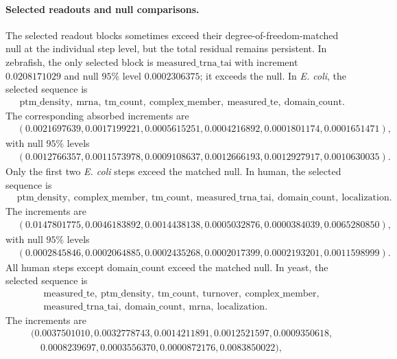 \paragraph{Selected readouts and null comparisons.}
The selected readout blocks sometimes exceed their degree-of-freedom-matched null at the individual step level, but the total residual remains persistent.  In zebrafish, the only selected block is $\mathrm{measured\_trna\_tai}$ with increment $0.0208171029$ and null $95\%$ level $0.0002306375$; it exceeds the null.  In \textit{E. coli}, the selected sequence is
$$
\begin{aligned}
&\mathrm{ptm\_density},\ \mathrm{mrna},\ \mathrm{tm\_count},\ \mathrm{complex\_member},\ \mathrm{measured\_te},\ \mathrm{domain\_count}.
\end{aligned}
$$
The corresponding absorbed increments are
$$
\begin{aligned}
&(0.0021697639,0.0017199221,0.0005615251,0.0004216892,0.0001801174,0.0001651471),
\end{aligned}
$$
with null $95\%$ levels
$$
\begin{aligned}
&(0.0012766357,0.0011573978,0.0009108637,0.0012666193,0.0012927917,0.0010630035).
\end{aligned}
$$
Only the first two \textit{E. coli} steps exceed the matched null.  In human, the selected sequence is
$$
\begin{aligned}
&\mathrm{ptm\_density},\ \mathrm{complex\_member},\ \mathrm{tm\_count},\ \mathrm{measured\_trna\_tai},\ \mathrm{domain\_count},\ \mathrm{localization}.
\end{aligned}
$$
The increments are
$$
\begin{aligned}
&(0.0147801775,0.0046183892,0.0014438138,0.0005032876,0.0000384039,0.0065280850),
\end{aligned}
$$
with null $95\%$ levels
$$
\begin{aligned}
&(0.0002845846,0.0002064885,0.0002435268,0.0002017399,0.0002193201,0.0011598999).
\end{aligned}
$$
All human steps except $\mathrm{domain\_count}$ exceed the matched null.  In yeast, the selected sequence is
$$
\begin{aligned}
&\mathrm{measured\_te},\ \mathrm{ptm\_density},\ \mathrm{tm\_count},\ \mathrm{turnover},\ \mathrm{complex\_member},\\
&\mathrm{measured\_trna\_tai},\ \mathrm{domain\_count},\ \mathrm{mrna},\ \mathrm{localization}.
\end{aligned}
$$
The increments are
$$
\begin{aligned}
&(0.0037501010,0.0032778743,0.0014211891,0.0012521597,0.0009350618,\\
&\quad 0.0008239697,0.0003556370,0.0000872176,0.0083850022),
\end{aligned}
$$
